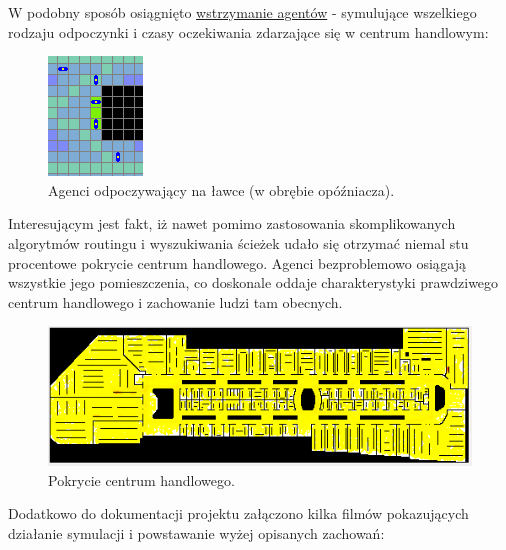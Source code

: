 \documentclass[a4paper, 12pt]{article}
\begin{document}
W podobny sposób osiągnięto \hyperref[sec:holders]{wstrzymanie agentów} - symulujące wszelkiego rodzaju odpoczynki i czasy oczekiwania zdarzające się w centrum handlowym:

        \begin{figure}[H]
          \centering
          \includegraphics[scale=0.7]{./img/hold.png}
          \caption{Agenci odpoczywający na ławce (w obrębie opóźniacza).}
          \label{fig:res-hold}
        \end{figure}

Interesującym jest fakt, iż nawet pomimo zastosowania skomplikowanych algorytmów routingu i wyszukiwania ścieżek udało się otrzymać niemal stu procentowe pokrycie centrum handlowego. Agenci bezproblemowo osiągają wszystkie jego pomieszczenia, co doskonale oddaje charakterystyki prawdziwego centrum handlowego i zachowanie ludzi tam obecnych.

        \begin{figure}[H]
          \centering
          \includegraphics[scale=0.7]{./img/coverage.png}
          \caption{Pokrycie centrum handlowego.}
          \label{fig:res-coverage}
        \end{figure}


Dodatkowo do dokumentacji projektu załączono kilka filmów pokazujących działanie symulacji i powstawanie wyżej opisanych zachowań:
\end{document}
